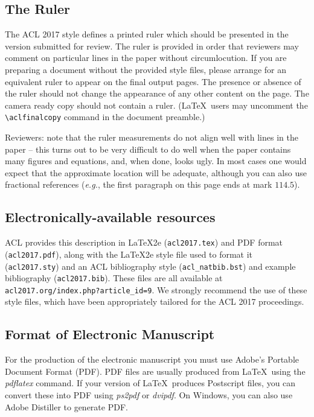 \documentclass[11pt,a4paper]{article}
\begin{document}
\subsection{The Ruler}
The ACL 2017 style defines a printed ruler which should be presented in the
version submitted for review.  The ruler is provided in order that
reviewers may comment on particular lines in the paper without
circumlocution.  If you are preparing a document without the provided
style files, please arrange for an equivalent ruler to
appear on the final output pages.  The presence or absence of the ruler
should not change the appearance of any other content on the page.  The
camera ready copy should not contain a ruler. (\LaTeX\ users may uncomment
the {\small\verb|\aclfinalcopy|} command in the document preamble.)  

Reviewers: note that the ruler measurements do not align well with
lines in the paper -- this turns out to be very difficult to do well
when the paper contains many figures and equations, and, when done,
looks ugly. In most cases one would expect that the approximate
location will be adequate, although you can also use fractional
references ({\em e.g.}, the first paragraph on this page ends at mark $114.5$).

\subsection{Electronically-available resources}

ACL provides this description in \LaTeX2e{} ({\small\tt acl2017.tex}) and PDF
format ({\small\tt acl2017.pdf}), along with the \LaTeX2e{} style file used to
format it ({\small\tt acl2017.sty}) and an ACL bibliography style ({\small\tt acl\_natbib.bst})
and example bibliography ({\small\tt acl2017.bib}).
These files are all available at
{\small\tt acl2017.org/index.php?article\_id=9}. We
strongly recommend the use of these style files, which have been
appropriately tailored for the ACL 2017 proceedings.

\subsection{Format of Electronic Manuscript}
\label{sect:pdf}

For the production of the electronic manuscript you must use Adobe's
Portable Document Format (PDF). PDF files are usually produced from
\LaTeX\ using the \textit{pdflatex} command. If your version of
\LaTeX\ produces Postscript files, you can convert these into PDF
using \textit{ps2pdf} or \textit{dvipdf}. On Windows, you can also use
Adobe Distiller to generate PDF.
\end{document}
